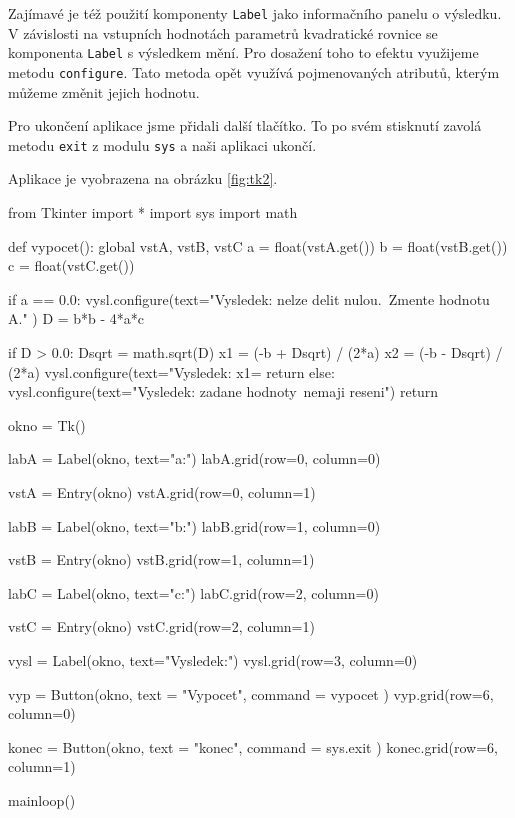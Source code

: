 Zajímavé je též použití komponenty \texttt{Label} jako informačního panelu o výsledku. V závislosti na vstupních hodnotách parametrů kvadratické rovnice se komponenta \texttt{Label} s výsledkem mění. Pro dosažení toho to efektu využijeme metodu \texttt{configure}. Tato metoda opět využívá pojmenovaných atributů, kterým můžeme změnit jejich hodnotu.

Pro ukončení aplikace jsme přidali další tlačítko. To po svém stisknutí zavolá metodu \texttt{exit} z modulu \texttt{sys} a naši aplikaci ukončí.


Aplikace je vyobrazena na obrázku \ref{fig:tk2}.

\begin{python}
from Tkinter import *
import sys
import math

def vypocet():
    global vstA, vstB, vstC
    a = float(vstA.get())
    b = float(vstB.get())
    c = float(vstC.get())
    
    if a == 0.0:
        vysl.configure(text="Vysledek: nelze delit nulou.\
                       Zmente hodnotu A." )
    D = b*b - 4*a*c
    
    if D > 0.0:
        Dsqrt = math.sqrt(D)
        x1 = (-b + Dsqrt) / (2*a)
        x2 = (-b - Dsqrt) / (2*a)
        vysl.configure(text="Vysledek: x1=%
        return
    else:
        vysl.configure(text="Vysledek: zadane hodnoty\
                       nemaji reseni")
        return
    
okno = Tk()

labA = Label(okno, text="a:")
labA.grid(row=0, column=0)

vstA = Entry(okno)
vstA.grid(row=0, column=1)

labB = Label(okno, text="b:")
labB.grid(row=1, column=0)

vstB = Entry(okno)
vstB.grid(row=1, column=1)

labC = Label(okno, text="c:")
labC.grid(row=2, column=0)

vstC = Entry(okno)
vstC.grid(row=2, column=1)

vysl = Label(okno, text="Vysledek:")
vysl.grid(row=3, column=0)


vyp = Button(okno, text = "Vypocet", command = vypocet )
vyp.grid(row=6, column=0)

konec = Button(okno, text = "konec", command = sys.exit )
konec.grid(row=6, column=1)

mainloop()
\end{python}

